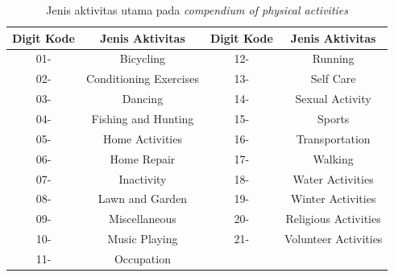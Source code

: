 \begin{longtable}{|c|c|c|c|}
  \caption{Jenis aktivitas utama pada \emph{compendium of physical activities}}
  \label{tb:metjenisaktivitas}  \\
  \hline
  \rowcolor[HTML]{C0C0C0}
  \textbf{Digit Kode} & \textbf{Jenis Aktivitas} & \textbf{Digit Kode} & \textbf{Jenis Aktivitas} \\
  \hline
  01-     & Bicycling                 & 12-    & Running     \\
  \hline
  02-     & Conditioning Exercises    & 13-    & Self Care     \\
  \hline
  03-     & Dancing                   & 14-    & Sexual Activity     \\
  \hline
  04-     & Fishing and Hunting       & 15-    & Sports    \\
  \hline
  05-     & Home Activities           & 16-    & Transportation     \\
  \hline
  06-     & Home Repair               & 17-    & Walking    \\
  \hline
  07-     & Inactivity                & 18-    & Water Activities    \\
  \hline
  08-     & Lawn and Garden           & 19-    & Winter Activities    \\
  \hline
  09-     & Miscellaneous             & 20-    & Religious Activities    \\
  \hline
  10-     & Music Playing             & 21-    & Volunteer Activities    \\
  \hline
  11-     & Occupation                &        &     \\
  \hline
\end{longtable}

